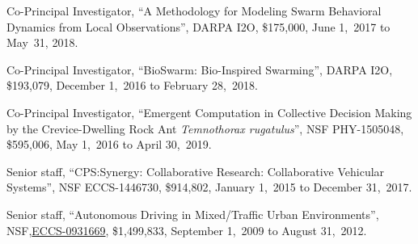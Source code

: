 \documentclass[10pt]{article}
\newcommand{\blankline}{\quad\pagebreak[3]}
\begin{document}
\begin{bibenum}
    \item Co-Principal Investigator, ``A Methodology for Modeling Swarm
        Behavioral Dynamics from Local Observations'', DARPA I2O,
        \$175,000, June 1,~2017 to May~31, 2018.

    \item Co-Principal Investigator, ``BioSwarm: Bio-Inspired
        Swarming'', DARPA I2O, \$193,079, December 1,~2016 to
        February 28,~2018.

    \item Co-Principal Investigator, ``Emergent Computation in
        Collective Decision Making by the Crevice-Dwelling Rock Ant
        \emph{Temnothorax rugatulus}'', NSF PHY-1505048, \$595,006, May
        1,~2016 to April 30,~2019.

    \item Senior staff,
        ``CPS:Synergy: Collaborative Research: Collaborative Vehicular
        Systems'', NSF ECCS-1446730, \$914,802, January 1,~2015 to
        December 31,~2017.

    \item Senior staff,
        ``Autonomous Driving in Mixed\-/Traffic Urban Environments'',
        NSF,\linebreak[4]
        \href{http://www.nsf.gov/awardsearch/showAward.do?AwardNumber=0931669}{ECCS-0931669},
        \$1,499,833, September 1,~2009 to August 31,~2012.

\end{bibenum}

%
%
%
%
%
%
%
%
\end{document}
